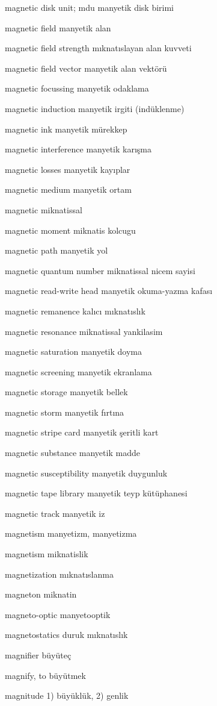 \documentclass[12pt,fleqn]{article}\usepackage{../../common}
\begin{document}
magnetic disk unit; mdu manyetik disk birimi

magnetic field manyetik alan

magnetic field strength mıknatıslayan alan kuvveti

magnetic field vector manyetik alan vektörü

magnetic focussing manyetik odaklama

magnetic induction manyetik irgiti (indüklenme)

magnetic ink manyetik mürekkep

magnetic interference manyetik karışma

magnetic losses manyetik kayıplar

magnetic medium manyetik ortam

magnetic miknatissal

magnetic moment miknatis kolcugu

magnetic path manyetik yol

magnetic quantum number miknatissal nicem sayisi

magnetic read-write head manyetik okuma-yazma kafası

magnetic remanence kalıcı mıknatıslık

magnetic resonance miknatissal yankilasim

magnetic saturation manyetik doyma

magnetic screening manyetik ekranlama

magnetic storage manyetik bellek

magnetic storm manyetik fırtına

magnetic stripe card manyetik şeritli kart

magnetic substance manyetik madde

magnetic susceptibility manyetik duygunluk

magnetic tape library manyetik teyp kütüphanesi

magnetic track manyetik iz

magnetism manyetizm, manyetizma

magnetism miknatislik

magnetization mıknatıslanma

magneton miknatin

magneto-optic manyetooptik

magnetostatics duruk mıknatıslık

magnifier büyüteç

magnify, to büyütmek

magnitude 1) büyüklük, 2) genlik
\end{document}
